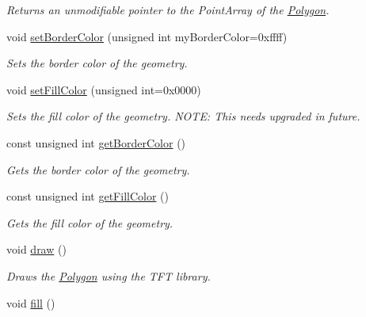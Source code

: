 \begin{DoxyCompactItemize}
\begin{DoxyCompactList}\small\item\em Returns an unmodifiable pointer to the Point\+Array of the \hyperlink{class_polygon}{Polygon}. \end{DoxyCompactList}\item 
void \hyperlink{class_polygon_a91e2048df838eefbf1b291cff13fa540}{set\+Border\+Color} (unsigned int my\+Border\+Color=0xffff)
\begin{DoxyCompactList}\small\item\em Sets the border color of the geometry. \end{DoxyCompactList}\item 
void \hyperlink{class_polygon_ad7caa8108c50e0caf41f286660bbf011}{set\+Fill\+Color} (unsigned int=0x0000)
\begin{DoxyCompactList}\small\item\em Sets the fill color of the geometry. N\+O\+T\+E\+: This needs upgraded in future. \end{DoxyCompactList}\item 
const unsigned int \hyperlink{class_polygon_a89f6cf0b0bc01911b959ada782f9dfd8}{get\+Border\+Color} ()
\begin{DoxyCompactList}\small\item\em Gets the border color of the geometry. \end{DoxyCompactList}\item 
const unsigned int \hyperlink{class_polygon_a1213dc7e01a5c9fc66f0b7190c8b02b6}{get\+Fill\+Color} ()
\begin{DoxyCompactList}\small\item\em Gets the fill color of the geometry. \end{DoxyCompactList}\item 
\hypertarget{class_polygon_a17428a7d7dff4653c905b91020a9f803}{void \hyperlink{class_polygon_a17428a7d7dff4653c905b91020a9f803}{draw} ()}\label{class_polygon_a17428a7d7dff4653c905b91020a9f803}

\begin{DoxyCompactList}\small\item\em Draws the \hyperlink{class_polygon}{Polygon} using the T\+F\+T library. \end{DoxyCompactList}\item 
\hypertarget{class_polygon_aaa6f282cafd882068fae7018741aabaf}{void \hyperlink{class_polygon_aaa6f282cafd882068fae7018741aabaf}{fill} ()}\label{class_polygon_aaa6f282cafd882068fae7018741aabaf}


\end{DoxyCompactItemize}
